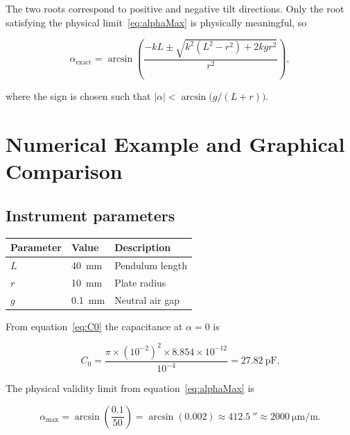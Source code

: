 \documentclass[11pt,a4paper]{article}
\begin{document}
The two roots correspond to positive and negative tilt directions.
Only the root satisfying the physical limit~\eqref{eq:alphaMax} is
physically meaningful, so

\begin{equation}
  \boxed{\alpha_{\text{exact}} = \arcsin\!\left(
         \frac{-kL \pm \sqrt{k^2(L^2 - r^2) + 2kgr^2}}{r^2}
         \right),}
  \label{eq:alphaExact}
\end{equation}

where the sign is chosen such that $|\alpha| <
\arcsin\!\bigl(g/(L+r)\bigr)$.

\section{Numerical Example and Graphical Comparison}

\subsection{Instrument parameters}

\begin{center}
\begin{tabular}{@{}lll@{}}
\toprule
Parameter & Value & Description \\
\midrule
$L$ & \SI{40}{\milli\metre} & Pendulum length \\
$r$ & \SI{10}{\milli\metre} & Plate radius \\
$g$ & \SI{0.1}{\milli\metre} & Neutral air gap \\
\bottomrule
\end{tabular}
\end{center}

From equation~\eqref{eq:C0} the capacitance at $\alpha = 0$ is

\begin{equation}
  C_0 = \frac{\pi \times (10^{-2})^2 \times 8.854\times10^{-12}}{10^{-4}}
      = \SI{27.82}{\pico\farad}.
\end{equation}

The physical validity limit from equation~\eqref{eq:alphaMax} is

\begin{equation}
  \alpha_{\max} = \arcsin\!\left(\frac{0.1}{50}\right)
                = \arcsin(0.002) \approx \SI{412.5}{\arcsecond}
                \approx \SI{2000}{\micro\metre\per\metre}.
\end{equation}
\end{document}
